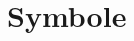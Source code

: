 \documentclass
[
  draft    = true,
  fontsize = 11pt,
  parskip  = half-,
  BCOR     = 0pt,
  DIV      = 12
]
{scrartcl}
\begin{document}

\section{Symbole}


\end{document}
